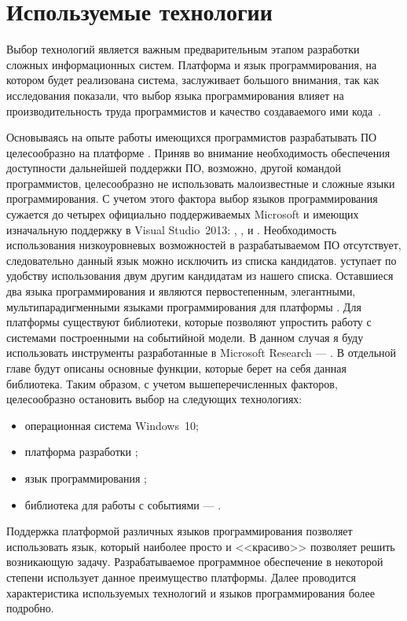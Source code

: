 \section{Используемые технологии}
\label{sec:practice:technology_used}

Выбор технологий является важным предварительным этапом разработки сложных информационных систем.
Платформа и язык программирования, на котором будет реализована система, заслуживает большого внимания, так как исследования показали, что выбор языка программирования влияет на производительность труда программистов и качество создаваемого ими кода~\cite[c.~59]{mcconnell_2005}.

Основываясь на опыте работы имеющихся программистов разрабатывать ПО целесообразно на платформе \dotnet{}.
Приняв во внимание необходимость обеспечения доступности дальнейшей поддержки ПО, возможно, другой командой программистов, целесообразно не использовать малоизвестные и сложные языки программирования.
С учетом этого фактора выбор языков программирования сужается до четырех официально поддерживаемых Microsoft и имеющих изначальную поддержку в Visual Studio~2013: \cppcli{}, \csharp{}, \vbnet{} и \fsharp{}.
Необходимость использования низкоуровневых возможностей \cppcli{} в разрабатываемом ПО отсутствует, следовательно данный язык можно исключить из списка кандидатов.
\vbnet{} уступает по удобству использования двум другим кандидатам из нашего списка.
Оставшиеся два языка программирования \csharp{} и \fsharp{} являются первостепенным, элегантными, мультипарадигменными языками программирования для платформы \dotnet.
Для платформы \dotnet{} существуют библиотеки, которые позволяют упростить работу с системами построенными на событийной модели.
В данном случая я буду использовать инструменты разработанные в Microsoft Research --- \rx{}. В отдельной главе будут описаны основные функции, которые берет на себя данная библиотека.
Таким образом, с учетом вышеперечисленных факторов, целесообразно остановить выбор на следующих технологиях:
\begin{itemize}
  \item операционная система Windows~10;
  \item платформа разработки \dotnet{};
  \item язык программирования \csharp{};
  \item библиотека для работы с событиями --- \rx{}.
\end{itemize}
Поддержка платформой \dotnet{} различных языков программирования позволяет использовать язык, который наиболее просто и <<красиво>> позволяет решить возникающую задачу.
Разрабатываемое программное обеспечение в некоторой степени использует данное преимущество платформы.
Далее проводится характеристика используемых технологий и языков программирования более подробно.


